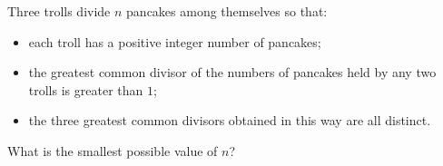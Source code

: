 Three trolls divide $n$ pancakes among themselves so that:
\begin{itemize}
\item each troll has a positive integer number of pancakes;
\item the greatest common divisor of the numbers of pancakes held by any two trolls is greater than $1$;
\item the three greatest common divisors obtained in this way are all distinct.
\end{itemize}
What is the smallest possible value of $n$?
